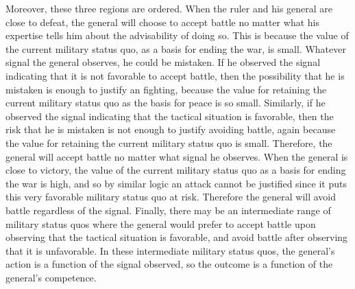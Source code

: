 \documentclass[11pt,]{article}
\begin{document}
Moreover, these three regions are ordered.  When the ruler and his general are close to defeat, the general will choose to accept battle no matter what his expertise tells him about the advisability of doing so.  This is because the value of the current military status quo, as a basis for ending the war, is small.  Whatever signal the general observes, he could be mistaken.  If he observed the signal indicating that it is not favorable to accept battle, then the possibility that he is mistaken is enough to justify an fighting, because the value for retaining the current military status quo as the basis for peace is so small.  Similarly, if he observed the signal indicating that the tactical situation is favorable, then the risk that he is mistaken is not enough to justify avoiding battle, again because the value for retaining the current military status quo is small.  Therefore, the general will accept battle no matter what signal he observes.  When the general is close to victory, the value of the current military status quo as a basis for ending the war is high, and so by similar logic an attack cannot be justified since it puts this very favorable military status quo at risk.  Therefore the general will avoid battle regardless of the signal.  Finally, there may be an intermediate range of military status quos where the general would prefer to accept battle upon observing that the tactical situation is favorable, and avoid battle after observing that it is unfavorable.  In these intermediate military status quos, the general's action is a function of the signal observed, so the outcome is a function of the general's competence.  
\end{document}
